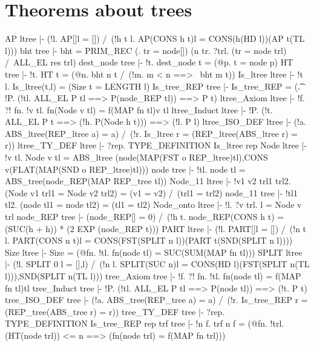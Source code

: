 \section{Theorems about trees}
\THEOREM AP ltree
|- (!l. AP[]l = []) /\
   (!h t l. AP(CONS h t)l = CONS(h(HD l))(AP t(TL l)))
\ENDTHEOREM
\THEOREM bht tree
|- bht =
   PRIM_REC
   (\tr. tr = node[])
   (\res n tr. ?trl. (tr = node trl) /\ ALL_EL res trl)
\ENDTHEOREM
\THEOREM dest\_node tree
|- !t. dest_node t = (@p. t = node p)
\ENDTHEOREM
\THEOREM HT tree
|- !t. HT t = (@n. bht n t /\ (!m. m < n ==> ~bht m t))
\ENDTHEOREM
\THEOREM Is\_ltree ltree
|- !t l. Is_ltree(t,l) = (Size t = LENGTH l)
\ENDTHEOREM
\THEOREM Is\_tree\_REP tree
|- Is_tree_REP = (\t. !P. (!tl. ALL_EL P tl ==> P(node_REP tl)) ==> P t)
\ENDTHEOREM
\THEOREM ltree\_Axiom ltree
|- !f. ?! fn. !v tl. fn(Node v tl) = f(MAP fn tl)v tl
\ENDTHEOREM
\THEOREM ltree\_Induct ltree
|- !P. (!t. ALL_EL P t ==> (!h. P(Node h t))) ==> (!l. P l)
\ENDTHEOREM
\THEOREM ltree\_ISO\_DEF ltree
|- (!a. ABS_ltree(REP_ltree a) = a) /\
   (!r. Is_ltree r = (REP_ltree(ABS_ltree r) = r))
\ENDTHEOREM
\THEOREM ltree\_TY\_DEF ltree
|- ?rep. TYPE_DEFINITION Is_ltree rep
\ENDTHEOREM
\THEOREM Node ltree
|- !v tl.
    Node v tl =
    ABS_ltree
    (node(MAP(FST o REP_ltree)tl),CONS v(FLAT(MAP(SND o REP_ltree)tl)))
\ENDTHEOREM
\THEOREM node tree
|- !tl. node tl = ABS_tree(node_REP(MAP REP_tree tl))
\ENDTHEOREM
\THEOREM Node\_11 ltree
|- !v1 v2 trl1 trl2.
    (Node v1 trl1 = Node v2 trl2) = (v1 = v2) /\ (trl1 = trl2)
\ENDTHEOREM
\THEOREM node\_11 tree
|- !tl1 tl2. (node tl1 = node tl2) = (tl1 = tl2)
\ENDTHEOREM
\THEOREM Node\_onto ltree
|- !l. ?v trl. l = Node v trl
\ENDTHEOREM
\THEOREM node\_REP tree
|- (node_REP[] = 0) /\
   (!h t. node_REP(CONS h t) = (SUC(h + h)) * (2 EXP (node_REP t)))
\ENDTHEOREM
\THEOREM PART ltree
|- (!l. PART[]l = []) /\
   (!n t l.
     PART(CONS n t)l = CONS(FST(SPLIT n l))(PART t(SND(SPLIT n l))))
\ENDTHEOREM
\THEOREM Size ltree
|- Size = (@fn. !tl. fn(node tl) = SUC(SUM(MAP fn tl)))
\ENDTHEOREM
\THEOREM SPLIT ltree
|- (!l. SPLIT 0 l = [],l) /\
   (!n l.
     SPLIT(SUC n)l = CONS(HD l)(FST(SPLIT n(TL l))),SND(SPLIT n(TL l)))
\ENDTHEOREM
\THEOREM tree\_Axiom tree
|- !f. ?! fn. !tl. fn(node tl) = f(MAP fn tl)tl
\ENDTHEOREM
\THEOREM tree\_Induct tree
|- !P. (!tl. ALL_EL P tl ==> P(node tl)) ==> (!t. P t)
\ENDTHEOREM
\THEOREM tree\_ISO\_DEF tree
|- (!a. ABS_tree(REP_tree a) = a) /\
   (!r. Is_tree_REP r = (REP_tree(ABS_tree r) = r))
\ENDTHEOREM
\THEOREM tree\_TY\_DEF tree
|- ?rep. TYPE_DEFINITION Is_tree_REP rep
\ENDTHEOREM
\THEOREM trf tree
|- !n f.
    trf n f =
    (@fn. !trl. (HT(node trl)) <= n ==> (fn(node trl) = f(MAP fn trl)))
\ENDTHEOREM
